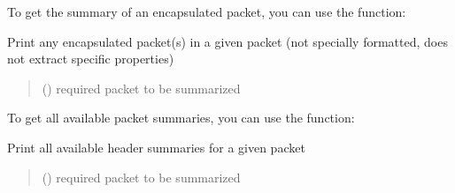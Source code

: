 \documentclass[letterpaper,10pt,english,openany,oneside]{sphinxmanual}
\begin{document}
\sphinxAtStartPar
To get the summary of an encapsulated packet, you can
use the  function:

\begin{fulllineitems}
\label{\detokenize{index:pktsniffer.get_encapsulated_packets_summary}}
\pysigstartsignatures
\pysiglinewithargsret
{}
{}
{}
\pysigstopsignatures
\sphinxAtStartPar
Print any encapsulated packet(s) in a given packet (not specially
formatted, does not extract specific properties)
\begin{quote}\begin{description}
\sphinxAtStartPar
{} () \textendash{} required packet to be summarized

\end{description}\end{quote}

\end{fulllineitems}


\sphinxAtStartPar
To get all available packet summaries, you can
use the  function:

\begin{fulllineitems}
\label{\detokenize{index:pktsniffer.get_packet_summary}}
\pysigstartsignatures
\pysiglinewithargsret
{}
{}
{}
\pysigstopsignatures
\sphinxAtStartPar
Print all available header summaries for a given packet
\begin{quote}\begin{description}
\sphinxAtStartPar
{} () \textendash{} required packet to be summarized

\end{description}\end{quote}

\end{fulllineitems}
\end{document}
